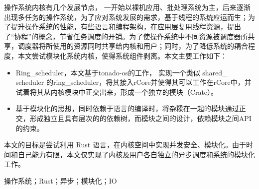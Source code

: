 \setlength{\headheight}{1.5cm}

\abstractcn


\begin{spacing}{1.625}

操作系统内核有几个发展节点， 一开始以裸机应用、批处理系统为主，后来逐渐出现多任务的操作系统，为了应对系统发展的需求，基于线程的系统应运而生；为了提升操作系统的性能，有些语言和编程架构，在应用层复用线程资源，提出了“协程”的概念，节省任务调度的开销。为了使操作系统中不同资源被调度器所共享，调度器将所使用的资源同时共享给内核和用户；同时，为了降低系统的耦合程度，本文尝试模块化系统内核，使得系统组件剥离。本文主要工作如下：

\begin{itemize}
\item Ring\_scheduler，本文基于tonado-os的工作， 实现一个类似 shared\_ scheduler 的ring\_scheduler，将其接入rCore并使得其可以工作在rCore中，并试着将其从内核模块中正交出来，形成一个独立的模块（Crate）。 

\item 基于模块化的思想，同时依赖于语言的编译时，将杂糅在一起的模块通过正交，形成独立且具有层次的的依赖树，而模块之间的设计，依赖模块之间API的约束。
\end{itemize}

本文的目标是尝试利用 Rust 语言，在内核空间中实现并发安全、模块化。由于时间和自己能力有限，本文仅实现了内核及用户各自独立的异步调度和系统的模块化工作。

\keywordscn\quad 操作系统；Rust；异步；模块化；IO
\end{spacing}
\let\cleardoublepage\clearpage
\abstracten

